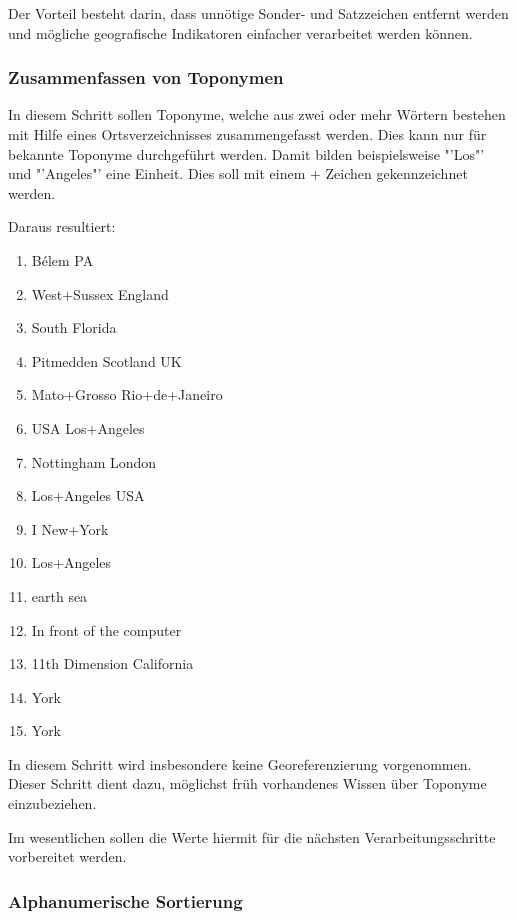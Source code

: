 				Der Vorteil besteht darin, dass unnötige Sonder- und Satzzeichen entfernt werden und mögliche geografische Indikatoren einfacher verarbeitet werden können.

			\subsubsection{Zusammenfassen von Toponymen}

				In diesem Schritt sollen Toponyme, welche aus zwei oder mehr Wörtern bestehen mit Hilfe eines Ortsverzeichnisses zusammengefasst werden. 
				Dies kann nur für bekannte Toponyme durchgeführt werden.
				Damit bilden beispielsweise "'Los"' und "'Angeles"' eine Einheit. 
				Dies soll mit einem + Zeichen gekennzeichnet werden.

				Daraus resultiert:

				\begin{multicols}{2}
					\begin{enumerate}
						\item Bélem PA
						\item West+Sussex England
						\item South Florida
						\item Pitmedden Scotland UK
						\item Mato+Grosso Rio+de+Janeiro
						\item USA Los+Angeles
						\item Nottingham London
						\item Los+Angeles USA
						\item I New+York 
						\item Los+Angeles
						\item earth sea
						\item In front of the computer
						\item 11th Dimension California
						\item York
						\item York
					\end{enumerate}
				\end{multicols}
				In diesem Schritt wird insbesondere keine Georeferenzierung vorgenommen. 
				Dieser Schritt dient dazu, möglichst früh vorhandenes Wissen über Toponyme einzubeziehen.

				Im wesentlichen sollen die Werte hiermit für die nächsten Verarbeitungsschritte vorbereitet werden.

			\subsubsection{Alphanumerische Sortierung}

